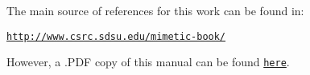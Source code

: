 The main source of references for this work can be found in\-:

\href{http://www.csrc.sdsu.edu/mimetic-book/}{\tt http\-://www.\-csrc.\-sdsu.\-edu/mimetic-\/book/}

However, a .P\-D\-F copy of this manual can be found \href{../latex/refman.pdf}{\tt here}. 